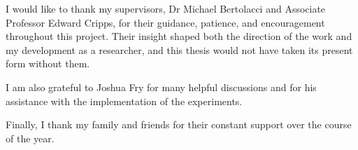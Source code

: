 I would like to thank my supervisors, Dr Michael Bertolacci and
Associate Professor Edward Cripps, for their guidance, patience, and
encouragement throughout this project. Their insight shaped both the
direction of the work and my development as a researcher, and this
thesis would not have taken its present form without them.

I am also grateful to Joshua Fry for many helpful discussions and for
his assistance with the implementation of the experiments.

Finally, I thank my family and friends for their constant support over
the course of the year.
